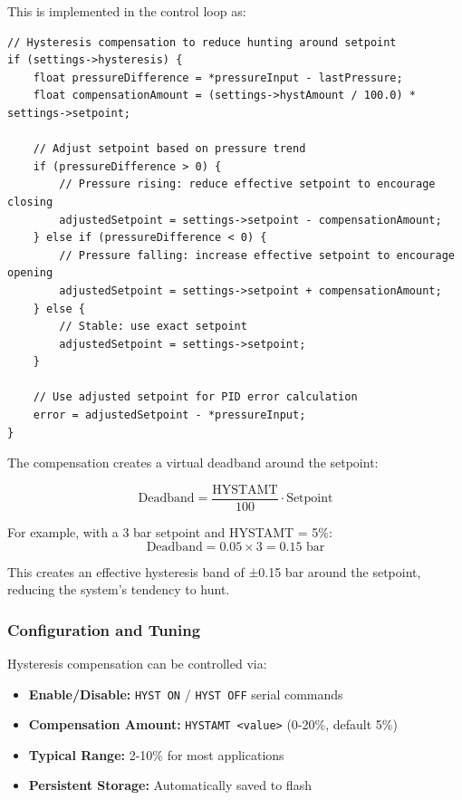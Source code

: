 This is implemented in the control loop as:

\begin{lstlisting}[caption=Hysteresis Compensation Mechanism]
// Hysteresis compensation to reduce hunting around setpoint
if (settings->hysteresis) {
    float pressureDifference = *pressureInput - lastPressure;
    float compensationAmount = (settings->hystAmount / 100.0) * settings->setpoint;
    
    // Adjust setpoint based on pressure trend
    if (pressureDifference > 0) {
        // Pressure rising: reduce effective setpoint to encourage closing
        adjustedSetpoint = settings->setpoint - compensationAmount;
    } else if (pressureDifference < 0) {
        // Pressure falling: increase effective setpoint to encourage opening
        adjustedSetpoint = settings->setpoint + compensationAmount;
    } else {
        // Stable: use exact setpoint
        adjustedSetpoint = settings->setpoint;
    }
    
    // Use adjusted setpoint for PID error calculation
    error = adjustedSetpoint - *pressureInput;
}
\end{lstlisting}

The compensation creates a virtual deadband around the setpoint:

\begin{equation}
\text{Deadband} = \frac{\text{HYSTAMT}}{100} \cdot \text{Setpoint}
\end{equation}

For example, with a 3 bar setpoint and HYSTAMT = 5\%:
$$\text{Deadband} = 0.05 \times 3 = 0.15 \text{ bar}$$

This creates an effective hysteresis band of ±0.15 bar around the setpoint, reducing the system's tendency to hunt.

\subsubsection{Configuration and Tuning}
Hysteresis compensation can be controlled via:

\begin{itemize}
    \item \textbf{Enable/Disable:} \texttt{HYST ON} / \texttt{HYST OFF} serial commands
    \item \textbf{Compensation Amount:} \texttt{HYSTAMT <value>} (0-20\%, default 5\%)
    \item \textbf{Typical Range:} 2-10\% for most applications
    \item \textbf{Persistent Storage:} Automatically saved to flash
\end{itemize}

